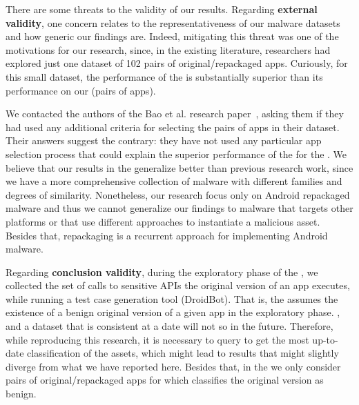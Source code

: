 There are some threats to the validity of our results.
Regarding {\bf external validity}, one concern relates to the 
representativeness of our malware datasets and how generic our findings are.
Indeed, mitigating this threat was one of the motivations for our research,
since, in the existing literature, researchers had explored just
one dataset of 102 pairs of original/repackaged apps. Curiously,
for this small dataset, the performance of the
\mas is substantially superior
than its performance on our \cds (\apps pairs of
apps).

We contacted the authors of the Bao et al. research paper~\cite{DBLP:conf/wcre/BaoLL18}, asking them
if they had used any additional criteria for selecting the pairs of apps in their
dataset. Their answers suggest the contrary: they have not used
any particular app selection process that
could explain the superior performance of the \mas for the \sds. We believe that
our results in the \cds generalize better than previous research work,
since we have a more comprehensive collection of malware with different
families and degrees of similarity. Nonetheless, our
research focus only on Android repackaged malware and thus we cannot generalize
our findings to malware that targets other platforms or that use different approaches
to instantiate a malicious asset. Besides that, repackaging is a recurrent approach
for implementing Android malware.

Regarding {\bf conclusion validity}, during the exploratory phase of the \mas, we collected the set of calls to sensitive APIs the original version of
an app executes, while running a test case generation tool (DroidBot).
That is, the \mas assumes the existence of a benign original
version of a given app in the exploratory phase. , and a dataset that is consistent at a date will
not so in the future.
Therefore, while reproducing this research, it is necessary to query \vt to get the most up-to-date classification of the assets, which might lead to results that might slightly
diverge from what we have reported here. Besides that, in the \cds we only consider
pairs of original/repackaged apps for which \vt classifies the original version as benign. 

